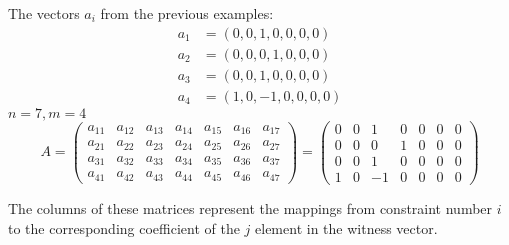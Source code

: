 \documentclass[../lecture-notes.tex]{subfiles}
\begin{document}
\begin{example}
    The vectors $a_i$ from the previous examples:
    \begin{align*}
        a_1 &= (0, 0, 1, 0, 0, 0, 0) \\
        a_2 &= (0, 0, 0, 1, 0, 0, 0) \\
        a_3 &= (0, 0, 1, 0, 0, 0, 0) \\
        a_4 &= (1, 0, -1, 0, 0, 0, 0)
    \end{align*}
    $n = 7, m = 4$
    \begin{equation*}
        A = \begin{pmatrix}
            a_{11} & a_{12} & a_{13} & a_{14} & a_{15} & a_{16} & a_{17} \\
            a_{21} & a_{22} & a_{23} & a_{24} & a_{25} & a_{26} & a_{27} \\
            a_{31} & a_{32} & a_{33} & a_{34} & a_{35} & a_{36} & a_{37} \\
            a_{41} & a_{42} & a_{43} & a_{44} & a_{45} & a_{46} & a_{47}
        \end{pmatrix} = \begin{pmatrix}
            0 & 0 & 1 & 0 & 0 & 0 & 0 \\
            0 & 0 & 0 & 1 & 0 & 0 & 0 \\
            0 & 0 & 1 & 0 & 0 & 0 & 0 \\
            1 & 0 & -1 & 0 & 0 & 0 & 0 
        \end{pmatrix}
    \end{equation*}
\end{example}

The columns of these matrices represent the mappings from constraint number $i$ to the corresponding
coefficient of the $j$ element in the witness vector.
\end{document}
